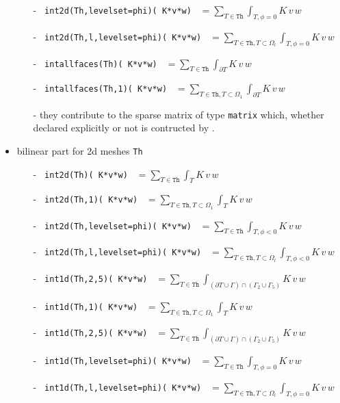 \documentclass[a4paper,twoside,12pt]{book}
\def\p{\partial}
\begin{document}
\begin{itemize}
\begin{itemize}
       \item[-]  \texttt{ int2d(Th,levelset=phi)( K*v*w) } $ \displaystyle = \sum_{T\in\mathtt{Th}}\int_{T,\phi=0} K\,v\,w  $ 
       \item[-]  \texttt{ int2d(Th,l,levelset=phi)( K*v*w) } $ \displaystyle = \sum_{T\in\mathtt{Th},T\subset \Omega_{l}}\int_{T,\phi=0} K\,v\,w  $ 

       \item[-] \texttt{ intallfaces(Th)( K*v*w) } $ \displaystyle = \sum_{T\in\mathtt{Th}}\int_{\p T } K\,v\,w  $ 
       \item[-] \texttt{ intallfaces(Th,1)( K*v*w) } $ \displaystyle = \sum_{{T\in\mathtt{Th},T\subset \Omega_{1}}}\int_{\p T } K\,v\,w  $ 

       
       \item[-]  they contribute to the sparse matrix of type \texttt{matrix} which, whether declared explicitly or not is contructed by \freefempp.
       \end{itemize}
           \item    bilinear part for 2d meshes \texttt{Th}

     \begin{itemize}
       \item[-]   \texttt{ int2d(Th)( K*v*w) } $ \displaystyle = \sum_{T\in\mathtt{Th}}\int_{T } K\,v\,w  $ 
       \item[-]   \texttt{ int2d(Th,1)( K*v*w) } $ \displaystyle = \sum_{T\in\mathtt{Th},T\subset \Omega_{1}}\int_{T} K\,v\,w  $ 
       \item[-]  \texttt{ int2d(Th,levelset=phi)( K*v*w) } $ \displaystyle = \sum_{T\in\mathtt{Th}}\int_{T,\phi<0} K\,v\,w  $ 
       \item[-]  \texttt{ int2d(Th,l,levelset=phi)( K*v*w) } $ \displaystyle = \sum_{T\in\mathtt{Th},T\subset \Omega_{l}}\int_{T,\phi<0} K\,v\,w  $ 

        \item[-] \texttt{ int1d(Th,2,5)( K*v*w) }  $ \displaystyle = \sum_{T\in\mathtt{Th}}\int_{(\p T\cup\Gamma) \cap ( \Gamma_2 \cup \Gamma_{5})
          } K\,v\,w  $ 
       \item[-]  \texttt{ int1d(Th,1)( K*v*w) } $ \displaystyle = \sum_{T\in\mathtt{Th},T\subset \Omega_{1}}\int_{T} K\,v\,w  $ 
        \item[-] \texttt{ int1d(Th,2,5)( K*v*w) }  $ \displaystyle = \sum_{T\in\mathtt{Th}}\int_{(\p T\cup\Gamma) \cap ( \Gamma_2 \cup \Gamma_{5})
          } K\,v\,w  $ 

       \item[-]  \texttt{ int1d(Th,levelset=phi)( K*v*w) } $ \displaystyle = \sum_{T\in\mathtt{Th}}\int_{T,\phi=0} K\,v\,w  $ 
       \item[-]  \texttt{ int1d(Th,l,levelset=phi)( K*v*w) } $ \displaystyle = \sum_{T\in\mathtt{Th},T\subset \Omega_{l}}\int_{T,\phi=0} K\,v\,w  $ 


\end{itemize}
\end{itemize}
\end{document}
